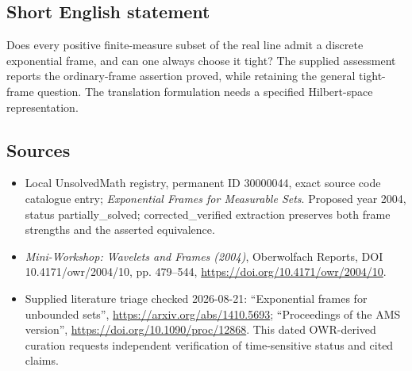 \documentclass[11pt]{article}
\begin{document}
\subsection{Short English statement}
Does every positive finite-measure subset of the real line admit a discrete exponential frame, and can one always choose it tight? The supplied assessment reports the ordinary-frame assertion proved, while retaining the general tight-frame question. The translation formulation needs a specified Hilbert-space representation.
\subsection{Sources}
\begin{itemize}
\item Local UnsolvedMath registry, permanent ID 30000044, exact source code catalogue entry; \emph{Exponential Frames for Measurable Sets}. Proposed year 2004, status partially\_solved; corrected\_verified extraction preserves both frame strengths and the asserted equivalence.
\item \emph{Mini-Workshop: Wavelets and Frames (2004)}, Oberwolfach Reports, DOI 10.4171/owr/2004/10, pp. 479--544, \url{https://doi.org/10.4171/owr/2004/10}.
\item Supplied literature triage checked 2026-08-21: ``Exponential frames for unbounded sets'', \url{https://arxiv.org/abs/1410.5693}; ``Proceedings of the AMS version'', \url{https://doi.org/10.1090/proc/12868}. This dated OWR-derived curation requests independent verification of time-sensitive status and cited claims.
\end{itemize}
\end{document}
